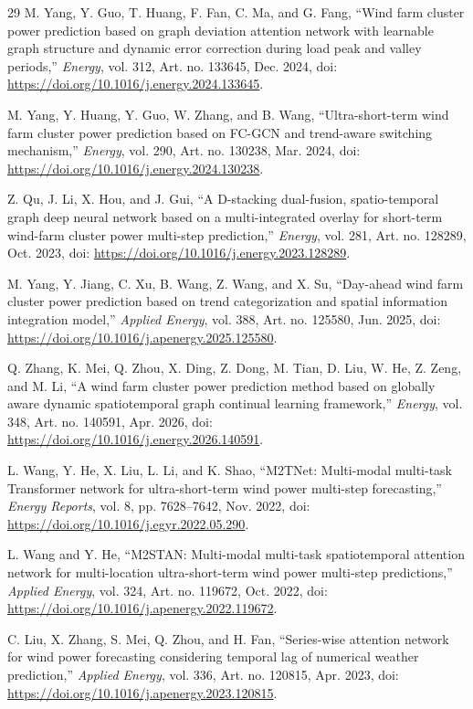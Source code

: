 \begin{thebibliography}{29}
M. Yang, Y. Guo, T. Huang, F. Fan, C. Ma, and G. Fang, ``Wind farm cluster power prediction based on graph deviation attention network with learnable graph structure and dynamic error correction during load peak and valley periods,'' \textit{Energy}, vol. 312, Art. no. 133645, Dec. 2024, doi: \url{https://doi.org/10.1016/j.energy.2024.133645}.

M. Yang, Y. Huang, Y. Guo, W. Zhang, and B. Wang, ``Ultra-short-term wind farm cluster power prediction based on FC-GCN and trend-aware switching mechanism,'' \textit{Energy}, vol. 290, Art. no. 130238, Mar. 2024, doi: \url{https://doi.org/10.1016/j.energy.2024.130238}.

Z. Qu, J. Li, X. Hou, and J. Gui, ``A D-stacking dual-fusion, spatio-temporal graph deep neural network based on a multi-integrated overlay for short-term wind-farm cluster power multi-step prediction,'' \textit{Energy}, vol. 281, Art. no. 128289, Oct. 2023, doi: \url{https://doi.org/10.1016/j.energy.2023.128289}.

M. Yang, Y. Jiang, C. Xu, B. Wang, Z. Wang, and X. Su, ``Day-ahead wind farm cluster power prediction based on trend categorization and spatial information integration model,'' \textit{Applied Energy}, vol. 388, Art. no. 125580, Jun. 2025, doi: \url{https://doi.org/10.1016/j.apenergy.2025.125580}.

Q. Zhang, K. Mei, Q. Zhou, X. Ding, Z. Dong, M. Tian, D. Liu, W. He, Z. Zeng, and M. Li, ``A wind farm cluster power prediction method based on globally aware dynamic spatiotemporal graph continual learning framework,'' \textit{Energy}, vol. 348, Art. no. 140591, Apr. 2026, doi: \url{https://doi.org/10.1016/j.energy.2026.140591}.

L. Wang, Y. He, X. Liu, L. Li, and K. Shao, ``M2TNet: Multi-modal multi-task Transformer network for ultra-short-term wind power multi-step forecasting,'' \textit{Energy Reports}, vol. 8, pp. 7628--7642, Nov. 2022, doi: \url{https://doi.org/10.1016/j.egyr.2022.05.290}.

L. Wang and Y. He, ``M2STAN: Multi-modal multi-task spatiotemporal attention network for multi-location ultra-short-term wind power multi-step predictions,'' \textit{Applied Energy}, vol. 324, Art. no. 119672, Oct. 2022, doi: \url{https://doi.org/10.1016/j.apenergy.2022.119672}.

C. Liu, X. Zhang, S. Mei, Q. Zhou, and H. Fan, ``Series-wise attention network for wind power forecasting considering temporal lag of numerical weather prediction,'' \textit{Applied Energy}, vol. 336, Art. no. 120815, Apr. 2023, doi: \url{https://doi.org/10.1016/j.apenergy.2023.120815}.


\end{thebibliography}
